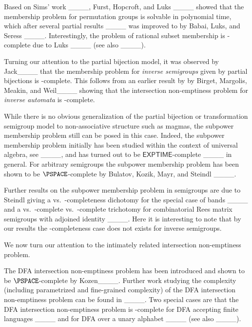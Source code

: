 Based on Sims' work ____, Furst, Hopcroft, and Luks ____ showed that the membership problem for permutation groups is solvable in polynomial time, which after several partial results ____ was improved to \NC by Babai, Luks, and Seress ____.
Interestingly, the problem of rational subset membership is \NP-complete due to Luks ____ (see also ____).

Turning our attention to the partial bijection model, it was observed by Jack____ that the membership problem for \emph{inverse semigroups} given by partial bijections is \PSPACE-complete.
This follows from an earlier result by by Birget, Margolis, Meakin, and Weil____ showing that the intersection non-emptiness problem for \emph{inverse automata} is \PSPACE-complete.

While there is no obvious generalization of the partial bijection or transformation semigroup model to non-associative structure such as magmas, the subpower membership problem still can be posed in this case.
Indeed, the subpower membership problem initially has been studied within the context of universal algebra, see \eg ____, and has turned out to be $\mathsf{EXPTIME}$-complete ____ in general.
For arbitrary semi\-groups the subpower membership problem has been shown to be $\PSPACE$-complete by Bulatov, Kozik, Mayr, and Steindl ____.

Further results on the subpower membership problem in semigroups are due to Steindl giving a \Ptime vs.\ \NP-completeness dichotomy for the special case of bands ____ and a \Ptime vs.\ \NP-complete vs.\ \PSPACE-complete trichotomy for combinatorial Rees matrix semigroups with adjoined identity
____. 
Here it is interesting to note that by our results the \NP-completeness case does not exists for inverse semigroups.

\medbreak

We now turn our attention to the intimately related intersection non-emptiness problem.

The DFA intersection non-emptiness problem has been introduced and shown to be $\PSPACE$-complete by Kozen____.
Further work studying the complexity (including parametrized and fine-grained complexity) of the DFA intersection non-emptiness problem can be found in ____.
Two special cases are that the DFA intersection non-emptiness problem is \NP-complete for DFA accepting finite languages ____ and for DFA over a unary alphabet ____ (see also ____).

